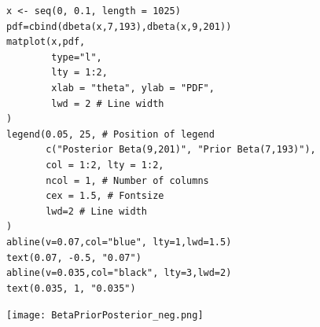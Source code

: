 \begin{frame}[fragile]

\begin{minipage}{0.45\textwidth}
 \begin{lstlisting}
x <- seq(0, 0.1, length = 1025)
pdf=cbind(dbeta(x,7,193),dbeta(x,9,201))
matplot(x,pdf,
        type="l",
        lty = 1:2,
        xlab = "theta", ylab = "PDF",
        lwd = 2 # Line width
)
legend(0.05, 25, # Position of legend
       c("Posterior Beta(9,201)", "Prior Beta(7,193)"),
       col = 1:2, lty = 1:2,
       ncol = 1, # Number of columns
       cex = 1.5, # Fontsize
       lwd=2 # Line width
)
abline(v=0.07,col="blue", lty=1,lwd=1.5)
text(0.07, -0.5, "0.07")
abline(v=0.035,col="black", lty=3,lwd=2)
text(0.035, 1, "0.035")
 \end{lstlisting}
\end{minipage}
\begin{minipage}{0.5\textwidth}
 \centering
 \texttt{[image: BetaPriorPosterior\_neg.png]}
\end{minipage}
 \end{frame}

